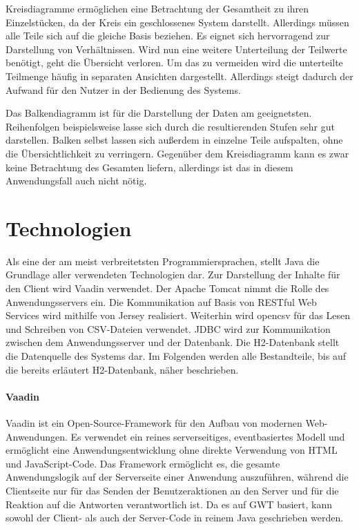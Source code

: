 Kreisdiagramme ermöglichen eine Betrachtung der Gesamtheit zu ihren Einzelstücken, da der Kreis ein geschlossenes System darstellt. Allerdings müssen alle Teile sich auf die gleiche Basis beziehen. Es eignet sich hervorragend zur Darstellung von Verhältnissen. Wird nun eine weitere Unterteilung der Teilwerte benötigt, geht die Übersicht verloren. Um das zu vermeiden wird die unterteilte Teilmenge häufig in separaten Ansichten dargestellt. Allerdings steigt dadurch der Aufwand für den Nutzer in der Bedienung des Systems. 

Das Balkendiagramm ist für die Darstellung der Daten am geeignetsten. Reihenfolgen beispielsweise lasse sich durch die resultierenden Stufen sehr gut darstellen. Balken selbst lassen sich außerdem in einzelne Teile aufspalten, ohne die Übersichtlichkeit zu verringern. Gegenüber dem Kreisdiagramm kann es zwar keine Betrachtung des Gesamten liefern, allerdings ist das in diesem Anwendungsfall auch nicht nötig. 

\section{Technologien}

Als eine der am meist verbreitetsten Programmiersprachen, stellt Java die Grundlage aller verwendeten Technologien dar. Zur Darstellung der Inhalte für den Client wird Vaadin verwendet. Der Apache Tomcat nimmt die Rolle des Anwendungsservers ein. Die Kommunikation auf Basis von RESTful Web Services wird mithilfe von Jersey realisiert. Weiterhin wird opencsv für das Lesen und Schreiben von CSV-Dateien verwendet. JDBC wird zur Kommunikation zwischen dem Anwendungsserver und der Datenbank. Die H2-Datenbank stellt die Datenquelle des Systems dar. Im Folgenden werden alle Bestandteile, bis auf die bereits erläutert H2-Datenbank, näher beschrieben. 

\paragraph{Vaadin}

Vaadin ist ein Open-Source-Framework für den Aufbau von modernen Web-Anwendungen.
Es verwendet ein reines serverseitiges, eventbasiertes Modell und ermöglicht eine Anwendungsentwicklung ohne direkte Verwendung von HTML und JavaScript-Code. Das Framework ermöglicht es, die gesamte Anwendungslogik auf der Serverseite einer Anwendung auszuführen, während die Clientseite nur für das Senden der Benutzeraktionen an den Server und für die Reaktion auf die Antworten verantwortlich ist. Da es auf GWT basiert, kann sowohl der Client- als auch der Server-Code in reinem Java geschrieben werden.

